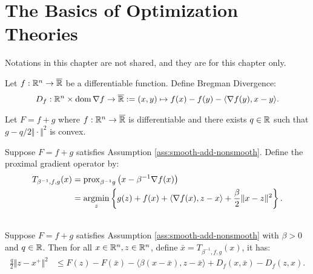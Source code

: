 \documentclass[12pt]{report}
\begin{document}
\chapter{The Basics of Optimization Theories}
    Notations in this chapter are not shared, and they are for this chapter only. 
    \begin{definition}\label{def:bregman-div}
        Let $f:\mathbb R^n \rightarrow \overline {\mathbb R}$ be a differentiable function. 
        Define Bregman Divergence: 
        \begin{align*}
            D_f: \mathbb R^n \times \operatorname{dom} \nabla f \rightarrow \overline {\mathbb R}:= 
            (x, y) \mapsto f(x) - f(y) - \langle \nabla f(y), x - y\rangle. 
        \end{align*}
    \end{definition}
    \begin{assumption}\label{ass:smooth-add-nonsmooth}
        Let $F = f+ g$ where $f:\mathbb R^n \rightarrow \overline {\mathbb R}$ is differentiable and there exists $q\in \mathbb R$ such that $g - q/2\Vert \cdot\Vert^2$ is convex.
    \end{assumption}
    \begin{definition}
        Suppose $F = f + g$ satisfies Assumption \ref{ass:smooth-add-nonsmooth}. 
        Define the proximal gradient operator by: 
        \begin{align*}
            T_{\beta^{-1}, f, g}(x) &= \operatorname{prox}_{\beta^{-1}g} \left(
                x - \beta^{-1} \nabla f(x)
            \right)
            \\
            &= \mathop{\rm argmin}\limits_{z}\left\lbrace
                g(z) + f(x) + \langle \nabla f(x), z - x\rangle
                + \frac{\beta}{2}\Vert x - z\Vert^2
            \right\rbrace. 
        \end{align*}
    \end{definition}
    \begin{theorem}\label{thm:pg-ineq-wcnvx-generic}\;\\
        Suppose $F = f + g$ satisfies Assumption \ref{ass:smooth-add-nonsmooth} with $\beta > 0$ and $q \in \mathbb R$. 
        Then for all $x \in \mathbb R^n, z \in \mathbb R^n$, define $\bar x = T_{\beta^{-1}, f, g}(x)$, it has: 
        \begin{align*}
            \frac{q}{2}\Vert z - x^+\Vert^2 
            &\le 
            F(z) - F(\bar x) - \langle \beta(x - \bar x), z - \bar x\rangle 
            + D_f(x, \bar x ) - D_f(z, x).  
        \end{align*}
    \end{theorem}
\end{document}
